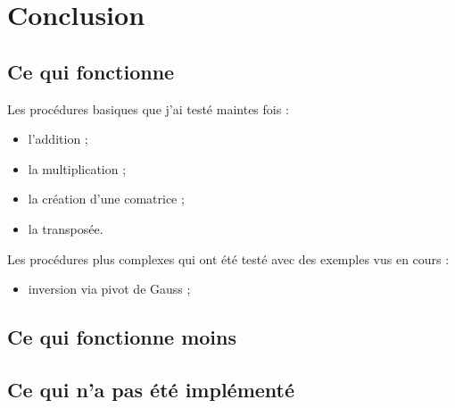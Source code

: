 \chapter{Conclusion}

\section{Ce qui fonctionne}

Les procédures basiques que j'ai testé maintes fois : 
\begin{itemize}
	\item l'addition ;
	\item la multiplication ;
	\item la création d'une comatrice ;
	\item la transposée.
\end{itemize}

Les procédures plus complexes qui ont été testé avec des exemples vus en cours :
\begin{itemize}
	\item inversion via pivot de Gauss ;
\end{itemize}


\section{Ce qui fonctionne moins}
\section{Ce qui n'a pas été implémenté}
